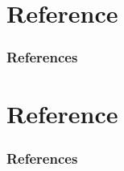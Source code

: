 \documentclass[10pt]{beamer}
\begin{document}
\section*{Reference}

\begin{frame}[allowframebreaks]
	\frametitle{References}
	
	\footnotesize
	
\end{frame}




\section*{Reference}

\begin{frame}[allowframebreaks]
	\frametitle{References}
	
	\footnotesize
	
\end{frame}
\end{document}
